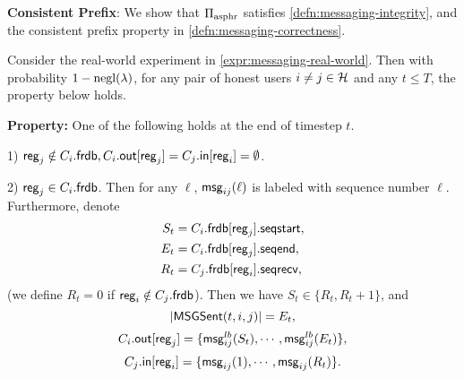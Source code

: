 \textbf{Consistent Prefix}: We show that $\Pi_{\text{asphr}}$ satisfies \cref{defn:messaging-integrity}, and the consistent prefix property in \cref{defn:messaging-correctness}.
\begin{lemma}
\label{lem:messaging-correctness-main}
Consider the real-world experiment in \cref{expr:messaging-real-world}. Then with probability $1 - \operatorname{negl}(\lambda)$, for any pair of honest users $i \neq j \in \mathcal{H}$ and any $t \leq T$, the property below holds.

\textbf{Property: }One of the following holds at the end of timestep $t$.

1) $\mathsf{reg}_j \notin C_i.\mathsf{frdb}, C_i.\mathsf{out}[\mathsf{reg}_j] = C_j.\mathsf{in}[\mathsf{reg}_i] = \emptyset$.

2) $\mathsf{reg}_j \in C_i.\mathsf{frdb}$. Then  for any $\ell$, $\mathsf{msg}_{ij}(\ell)$ is labeled with sequence number $\ell$. Furthermore, denote
\begin{align*}
S_t &= C_i.\mathsf{frdb}[\mathsf{reg}_j].\mathsf{seqstart}, \\
E_t &= C_i.\mathsf{frdb}[\mathsf{reg}_j].\mathsf{seqend}, \\
R_t &= C_j.\mathsf{frdb}[\mathsf{reg}_i].\mathsf{seqrecv},
\end{align*}
(we define $R_t = 0$ if $\mathsf{reg}_i \notin C_j.\mathsf{frdb}$). Then we have $S_t \in \{R_t, R_t + 1\}$, and
$$\left| \mathsf{MSGSent}(t, i, j) \right| = E_t,$$
$$C_i.\mathsf{out}[\mathsf{reg}_j] = \{\mathsf{msg}^{lb}_{ij}(S_t), \cdots, \mathsf{msg}^{lb}_{ij}(E_t)\},$$
$$C_j.\mathsf{in}[\mathsf{reg}_i] = \{\mathsf{msg}_{ij}(1), \cdots, \mathsf{msg}_{ij}(R_t)\}.$$
\end{lemma}
